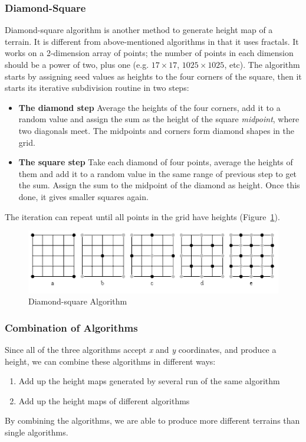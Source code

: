 \subsubsection{Diamond-Square}
Diamond-square algorithm is another method to generate height map of a terrain. It is different from above-mentioned algorithms in that it uses fractals. It works on a 2-dimension array of points; the number of points in each dimension should be a power of two, plus one (e.g. $17 \times 17$, $1025 \times 1025$, etc). The algorithm starts by assigning seed values as heights to the four corners of the square, then it starts its iterative subdivision routine in two steps:
\begin{itemize}
	\item \textbf{The diamond step} Average the heights of the four corners, add it to a random value and assign the sum as the height of the square \textit{midpoint}, where two diagonals meet. The midpoints and corners form diamond shapes in the grid.
	\item \textbf{The square step} Take each diamond of four points, average the heights of them and add it to a random value in the same range of previous step to get the sum. Assign the sum to the midpoint of the diamond as height. Once this done, it gives smaller squares again.
\end{itemize}
The iteration can repeat until all points in the grid have heights (Figure~\ref{fig:dsa}).
\begin{figure}
	\center
	\includegraphics[scale=0.5]{dsa.png}
	\caption{Diamond-square Algorithm}
	\label{fig:dsa}
\end{figure}

\subsubsection{Combination of Algorithms}
Since all of the three algorithms accept \textit{x} and \textit{y} coordinates, and produce a height, we can combine these algorithms in different ways:
\begin{enumerate}
	\item Add up the height maps generated by several run of the same algorithm
	\item Add up the height maps of different algorithms
\end{enumerate}

By combining the algorithms, we are able to produce more different terrains than single algorithms.
